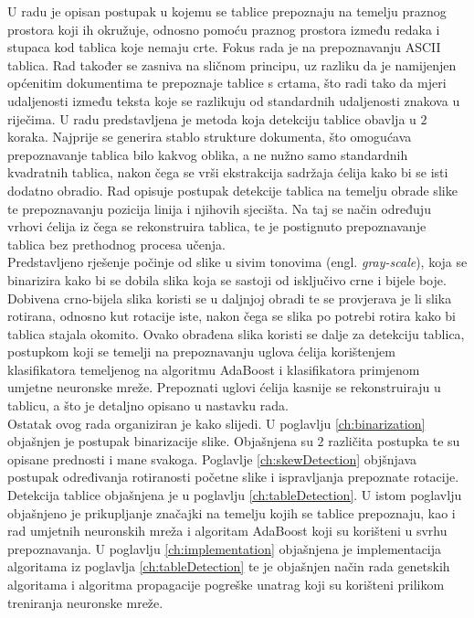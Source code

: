 \documentclass[times, utf8, zavrsni, numeric]{fer}
\begin{document}
U radu \cite{article:Medium-IndependentTableDetection} je opisan postupak u kojemu se tablice prepoznaju na temelju praznog prostora koji ih okružuje, odnosno pomoću praznog prostora između redaka i stupaca kod tablica koje nemaju crte. Fokus rada je na prepoznavanju ASCII tablica. Rad \cite{article:SimpleAndEffectiveTableDetectionSystemFromDocumentImages} također se zasniva na sličnom principu, uz razliku da je namijenjen općenitim dokumentima te prepoznaje tablice s crtama, što radi tako da mjeri udaljenosti između teksta koje se razlikuju od standardnih udaljenosti znakova u riječima.
U radu \cite{LayoutRecognitionofTable-Form} predstavljena je metoda koja detekciju tablice obavlja u $2$ koraka.
Najprije se generira stablo strukture dokumenta, što omogućava prepoznavanje tablica bilo kakvog oblika, a ne nužno samo standardnih kvadratnih tablica, nakon čega se vrši ekstrakcija sadržaja ćelija kako bi se isti dodatno obradio.
Rad \cite{conference:AutomaticTableDetectionInDocumentImages} opisuje postupak detekcije tablica na temelju obrade slike te prepoznavanju pozicija linija i njihovih sjecišta.
Na taj se način određuju vrhovi ćelija iz čega se rekonstruira tablica, te je postignuto prepoznavanje tablica bez prethodnog procesa učenja.
\\

Predstavljeno rješenje počinje od slike u sivim tonovima (engl. \textit{gray-scale}), koja se binarizira kako bi se dobila slika koja se sastoji od isključivo crne i bijele boje.
Dobivena crno-bijela slika koristi se u daljnjoj obradi te se provjerava je li slika rotirana, odnosno kut rotacije iste, nakon čega se slika po potrebi rotira kako bi tablica stajala okomito.
Ovako obrađena slika koristi se dalje za detekciju tablica, postupkom koji se temelji na prepoznavanju uglova ćelija korištenjem klasifikatora temeljenog na algoritmu AdaBoost i klasifikatora primjenom umjetne neuronske mreže.
Prepoznati uglovi ćelija kasnije se rekonstruiraju u tablicu, a što je detaljno opisano u nastavku rada.\\

Ostatak ovog rada organiziran je kako slijedi.
U poglavlju \ref{ch:binarization} objašnjen je postupak binarizacije slike.
Objašnjena su $2$ različita postupka te su opisane prednosti i mane svakoga.
Poglavlje \ref{ch:skewDetection} objšnjava postupak određivanja rotiranosti početne slike i ispravljanja prepoznate rotacije.
Detekcija tablice objašnjena je u poglavlju \ref{ch:tableDetection}.
U istom poglavlju objašnjeno je prikupljanje značajki na temelju kojih se tablice prepoznaju, kao i rad umjetnih neuronskih mreža i algoritam AdaBoost koji su korišteni u svrhu prepoznavanja.
U poglavlju \ref{ch:implementation} objašnjena je implementacija algoritama iz poglavlja \ref{ch:tableDetection} te je objašnjen način rada genetskih algoritama i algoritma propagacije pogreške unatrag koji su korišteni prilikom treniranja neuronske mreže.
\end{document}
